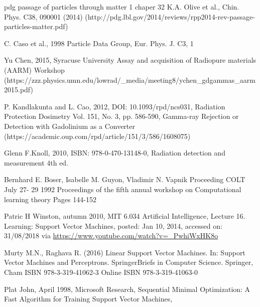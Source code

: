 \documentclass[12pt,a4paper]{article}
\begin{document}
\begin{thebibliography}{9}
pdg passage of particles through matter 1 chaper 32  K.A. Olive et al., Chin. Phys. C38, 090001 (2014) (http://pdg.lbl.gov/2014/reviews/rpp2014-rev-passage-particles-matter.pdf)

C. Caso et al., 1998 Particle Data Group, Eur. Phys. J. C3, 1 

Yu Chen, 2015, Syracuse University Assay and acquisition of Radiopure materials (AARM) Workshop (https://zzz.physics.umn.edu/lowrad/\_media/meeting8/ychen\_gdgammas\_aarm2015.pdf)

P. Kandlakunta and L. Cao, 2012, DOI: 10.1093/rpd/ncs031, Radiation Protection Dosimetry  Vol. 151, No. 3, pp. 586-590, Gamma-ray Rejection or Detection with Gadolinium as a Converter (https://academic.oup.com/rpd/article/151/3/586/1608075)

Glenn F.Knoll, 2010, ISBN: 978-0-470-13148-0, Radiation detection and measurement 4th ed.  


Bernhard E. Boser, Isabelle M. Guyon, Vladimir N. Vapnik Proceeding COLT July 27- 29 1992 Proceedings of the fifth annual workshop on Computational learning theory Pages 144-152 %

Patric H Winston, autumn 2010, MIT 6.034 Artificial Intelligence, Lecture 16. Learning: Support Vector Machines, posted:  Jan 10, 2014, accessed on: 31/08/2018 via \url{https://www.youtube.com/watch?v=_PwhiWxHK8o}

Murty M.N., Raghava R. (2016) Linear Support Vector Machines. In: Support Vector Machines and Perceptrons. SpringerBriefs in Computer Science. Springer, Cham ISBN 978-3-319-41062-3 Online ISBN 978-3-319-41063-0 

Plat John, April 1998, Microsoft Research, Sequential Minimal Optimization:  A Fast Algorithm for Training Support Vector Machines, %


\end{thebibliography}
\end{document}
